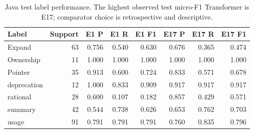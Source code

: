 \begin{table}[htbp]
\centering\small
\caption{Java test label performance. The highest observed test micro-F1 Transformer is E17; comparator choice is retrospective and descriptive.}\label{tab:javalabels}
\begin{tabular}{lrrrrrrr}\toprule
Label & Support & E1 P & E1 R & E1 F1 & E17 P & E17 R & E17 F1\\\midrule
Expand & 63 & 0.756 & 0.540 & 0.630 & 0.676 & 0.365 & 0.474\\
Ownership & 11 & 1.000 & 1.000 & 1.000 & 1.000 & 1.000 & 1.000\\
Pointer & 35 & 0.913 & 0.600 & 0.724 & 0.833 & 0.571 & 0.678\\
deprecation & 12 & 1.000 & 0.833 & 0.909 & 0.917 & 0.917 & 0.917\\
rational & 28 & 0.600 & 0.107 & 0.182 & 0.857 & 0.429 & 0.571\\
summary & 42 & 0.544 & 0.738 & 0.626 & 0.653 & 0.762 & 0.703\\
usage & 91 & 0.791 & 0.791 & 0.791 & 0.760 & 0.835 & 0.796\\
\bottomrule\end{tabular}
\end{table}
